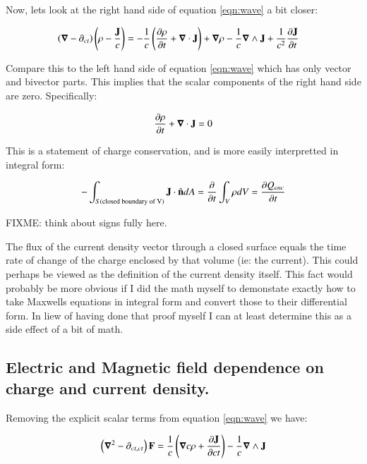 \documentclass{article}      %
\newcommand{\spacegrad}[0]{\boldsymbol{\nabla}}
\begin{document}
Now, lets look at the right hand side of equation \ref{eqn:wave} a bit closer:

\begin{align*}
\left(\spacegrad -\partial_{ct} \right) \left(\rho - \frac{\BJ}{c}\right) 
&= - \inv{c}\left(\frac{\partial \rho}{\partial t} + \spacegrad \cdot \BJ \right) + \spacegrad \rho - \inv{c}\spacegrad \wedge \BJ + \inv{c^2}\frac{\partial \BJ}{\partial t}
\end{align*}

Compare this to the left hand side of equation \ref{eqn:wave} which has only vector and bivector parts.  This implies that the scalar components of the right hand side are zero.  Specifically:

\begin{equation*}
\frac{\partial \rho}{\partial t} + \spacegrad \cdot \BJ = 0
\end{equation*}

This is a statement of charge conservation, and is more easily interpretted in integral form:

\begin{equation}
-\int_{S(\text{closed boundary of V})} \mathbf{J} \cdot \hat{\mathbf{n}} dA = \frac{\partial}{\partial t} \int_V \rho dV = \frac{\partial Q_{enc}}{\partial t}
\end{equation}

FIXME: think about signs fully here.

The flux of the current density vector through a closed surface equals the time rate of change of the charge enclosed by that volume (ie: the current).  This could perhaps be viewed as the definition of the current density itself.  This fact would probably be more obvious if I did the math myself to demonstate exactly how to take Maxwells equations in integral form and convert those to their differential form.  In liew of having done that proof myself I can at least determine this as a side effect of a bit of math.

\subsection{ Electric and Magnetic field dependence on charge and current density. }

Removing the explicit scalar terms from equation \ref{eqn:wave} we have:

\begin{equation*}
\left(\spacegrad^2 - \partial_{ct, ct}\right) \BF =
\inv{c } \left(\spacegrad c \rho + \frac{\partial \BJ}{\partial c t} \right)
- \inv{c } \spacegrad \wedge \BJ
\end{equation*}
\end{document}
